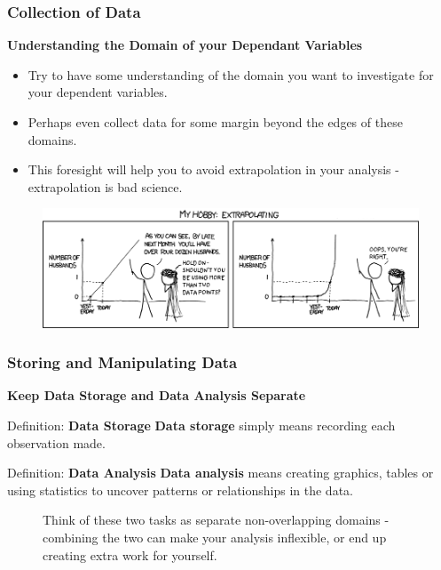 \documentclass{beamer}
\begin{document}
\begin{frame}
\frametitle{Collection of Data}
\textbf{Understanding the Domain of your Dependant Variables}\\
\vspace{0.2cm}
\begin{itemize}
\item Try to have some understanding of the domain you want to investigate for your dependent variables.
\vspace{0.1cm}
\item Perhaps even collect data for some margin beyond the edges of these domains.
\vspace{0.1cm}
\item This foresight will help you to avoid extrapolation in your analysis - extrapolation is bad science.
\end{itemize}
\begin{figure}
\includegraphics[scale=0.35]{extrap}
\end{figure}
\end{frame}


\begin{frame}
\frametitle{Storing and Manipulating Data}
\textbf{Keep Data Storage and Data Analysis Separate}\\
\vspace{0.2cm}
\begin{block}{Definition: \textbf{Data Storage}}
\textbf{Data storage} simply means recording each observation made.
\end{block}
\begin{block}{Definition: \textbf{Data Analysis}}
\textbf{Data analysis} means creating graphics, tables or using statistics to uncover patterns or relationships in the data.
\end{block}  
\begin{figure}
\caption{Think of these two tasks as separate non-overlapping domains - combining the two can make your analysis inflexible, or end up creating extra work for yourself.}
\end{figure}
\end{frame}
\end{document}
